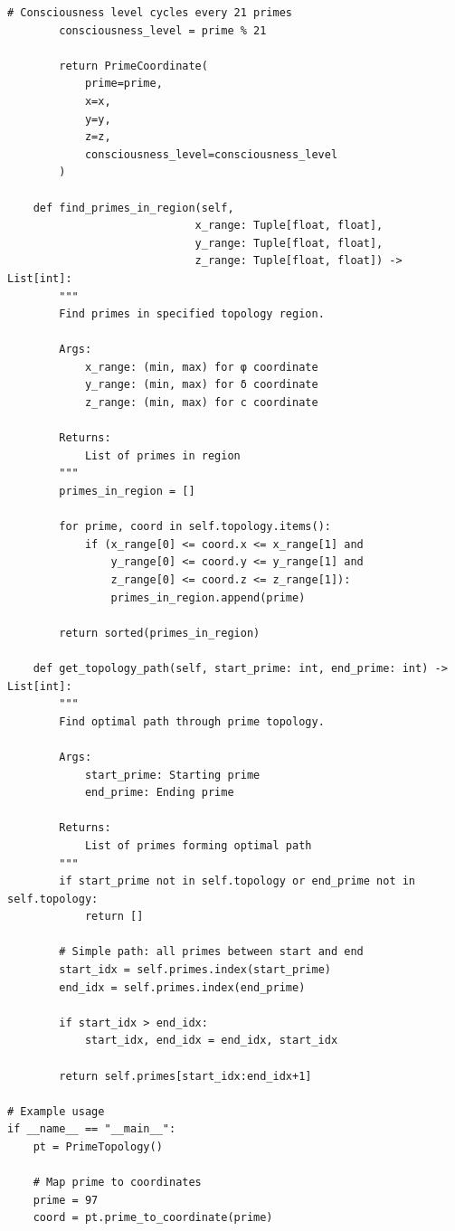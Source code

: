 \begin{lstlisting}[caption={Prime Topology Coordinate System Implementation},label={code:prime_topology}]
        # Consciousness level cycles every 21 primes
        consciousness_level = prime % 21
        
        return PrimeCoordinate(
            prime=prime,
            x=x,
            y=y,
            z=z,
            consciousness_level=consciousness_level
        )
    
    def find_primes_in_region(self, 
                             x_range: Tuple[float, float],
                             y_range: Tuple[float, float],
                             z_range: Tuple[float, float]) -> List[int]:
        """
        Find primes in specified topology region.
        
        Args:
            x_range: (min, max) for φ coordinate
            y_range: (min, max) for δ coordinate
            z_range: (min, max) for c coordinate
        
        Returns:
            List of primes in region
        """
        primes_in_region = []
        
        for prime, coord in self.topology.items():
            if (x_range[0] <= coord.x <= x_range[1] and
                y_range[0] <= coord.y <= y_range[1] and
                z_range[0] <= coord.z <= z_range[1]):
                primes_in_region.append(prime)
        
        return sorted(primes_in_region)
    
    def get_topology_path(self, start_prime: int, end_prime: int) -> List[int]:
        """
        Find optimal path through prime topology.
        
        Args:
            start_prime: Starting prime
            end_prime: Ending prime
        
        Returns:
            List of primes forming optimal path
        """
        if start_prime not in self.topology or end_prime not in self.topology:
            return []
        
        # Simple path: all primes between start and end
        start_idx = self.primes.index(start_prime)
        end_idx = self.primes.index(end_prime)
        
        if start_idx > end_idx:
            start_idx, end_idx = end_idx, start_idx
        
        return self.primes[start_idx:end_idx+1]

# Example usage
if __name__ == "__main__":
    pt = PrimeTopology()
    
    # Map prime to coordinates
    prime = 97
    coord = pt.prime_to_coordinate(prime)
    

\end{lstlisting}
